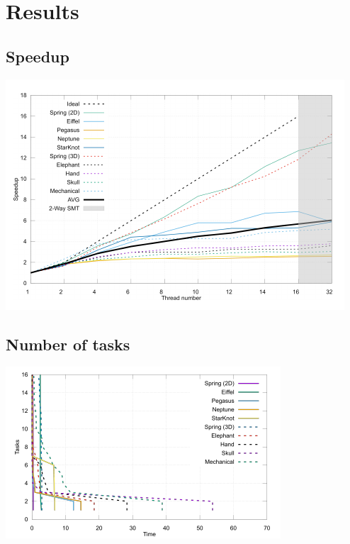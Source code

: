 \section*{Results}

\subsection*{Speedup}
\begin{frame*}
\includegraphics[width=\textwidth]{graph-speedup}
\end{frame*}

\subsection*{Number of tasks}
\begin{frame*}
\includegraphics[width=\textwidth]{graph-tasks}
\end{frame*}

